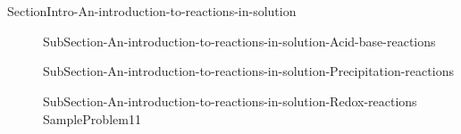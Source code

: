 \documentclass[main.tex]{subfiles} %
\newcommand\chapterlabel{Ch-electrolytes}\setcounter{figurenewcounter}{0}\setcounter{tablenewcounter}{0}\setcounter{formulanewcounter}{0}\chapterpicture{../{\chapterlabel}/figure1}\chapterpicturelabel{PxFuel}
\begin{document}
\section{\color{blue!30!black}{An introduction to reactions in solution}}{SectionIntro-An-introduction-to-reactions-in-solution}
\sloppy \begin{description}
\item[] {SubSection-An-introduction-to-reactions-in-solution-Acid-base-reactions}
\item[]{SubSection-An-introduction-to-reactions-in-solution-Precipitation-reactions}
\item[]{SubSection-An-introduction-to-reactions-in-solution-Redox-reactions}
{SampleProblem11}
\end{description}
\end{document}
